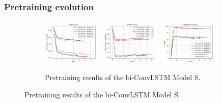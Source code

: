 \documentclass{beamer}
\begin{document}
\begin{frame}
    \frametitle{Pretraining evolution}
    \begin{figure}[htbp]
        \centering
        \begin{subfigure}[b]{\textwidth}
            \centering
            \includegraphics[width=0.32\textwidth]{../report/entities/pretrained/unipose/train_losses.png}
            \includegraphics[width=0.32\textwidth]{../report/entities/pretrained/unipose/val_losses.png}
            \includegraphics[width=0.32\textwidth]{../report/entities/pretrained/unipose/val_accs.png}
            \caption{Pretraining results of the bi-ConvLSTM Model S.}
        \end{subfigure}
        \hfill
        

\end{figure}
\end{frame}
\end{document}
